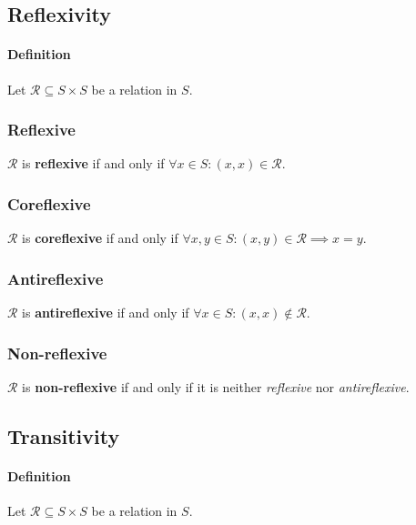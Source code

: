 \subsection{Reflexivity}
\label{sec:reflexivity}

\paragraph{Definition}

Let $\mathcal{R} \subseteq S \times S$ be a relation in $S$.

\subsubsection{Reflexive}

$\mathcal{R}$ is \textbf{reflexive} if and only if
$ \forall x \in S : (x, x) \in \mathcal{R} $.

\subsubsection{Coreflexive}

$\mathcal{R}$ is \textbf{coreflexive} if and only if
$ \forall x, y \in S : (x, y) \in \mathcal{R} \implies x = y$.

\subsubsection{Antireflexive}

$\mathcal{R}$ is \textbf{antireflexive} if and only if
$ \forall x \in S: (x, x) \notin \mathcal{R}$.

\subsubsection{Non-reflexive}

$\mathcal{R}$ is \textbf{non-reflexive} if and only if it is neither
\textit{reflexive} nor \textit{antireflexive}.


\subsection{Transitivity}
\label{sec:transitivity}

\paragraph{Definition}

Let $\mathcal{R} \subseteq S \times S$ be a relation in $S$.

